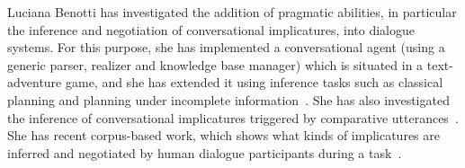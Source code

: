 Luciana Benotti has investigated the addition of pragmatic abilities, in
particular the inference and negotiation of conversational implicatures, into
dialogue systems. For this purpose, she has implemented a conversational agent
(using a generic parser, realizer and knowledge base manager) which  is situated
in a text-adventure game, and she has extended it using inference tasks such as
classical planning and planning under incomplete information~\cite{benotti09b}.
She has also investigated the inference of conversational implicatures triggered
by comparative utterances~\cite{benotti09a}. She has recent
corpus-based work, which shows what kinds of implicatures are inferred and
negotiated by human dialogue participants during a task~\cite{benotti09c}. 





